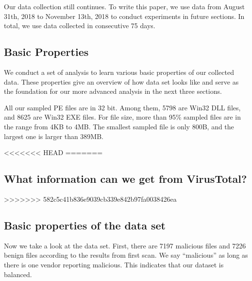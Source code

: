 Our data collection still continues. 
To write this paper, we use data from August 31th, 2018 to 
November 13th, 2018 to conduct experiments in future sections. 
In total, we use data collected in consecutive 75 days. 

\subsection{Basic Properties}


We conduct a set of analysis 
to learn various basic properties of our collected data.
These properties give an overview of how data set looks like
and serve as the foundation for our more 
advanced analysis in the next three sections. 

All our sampled PE files are in 32 bit. 
Among them, 5798 are Win32 DLL files, 
and 8625 are Win32 EXE files.
For file size, more than 95\% sampled 
files are in the range from 4KB to 4MB. 
The smallest sampled file is only 800B, 
and the largest one is larger than 389MB.







<<<<<<< HEAD
=======

\subsection{What information can we get from VirusTotal?}%
>>>>>>> 582c5c41b836e9039cb339e842b97fa0038426ea


\subsection{Basic properties of the data set}

Now we take a look at the data set. First, there are 7197 malicious files and 7226 benign files according to the results from first scan. We say ``malicious'' as long as there is one vendor reporting malicious. This indicates that our dataset is balanced.

